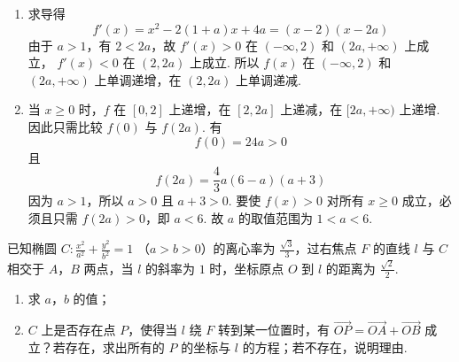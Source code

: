 \begin{solution}
\begin{enumerate}
\item 求导得
\[
f'(x)=x^2-2(1+a)x+4a=(x-2)(x-2a)
\]
由于 \(a>1\)，有 \(2<2a\)，故
\(f'(x)>0\) 在 \((-\infty,2)\) 和 \((2a,+\infty)\) 上成立，
\(f'(x)<0\) 在 \((2,2a)\) 上成立. 所以 \(f(x)\) 在
\((-\infty,2)\) 和 \((2a,+\infty)\) 上单调递增，在
\((2,2a)\) 上单调递减.
\item 当 \(x\geqslant0\) 时，\(f\) 在 \([0,2]\) 上递增，在
\([2,2a]\) 上递减，在 \([2a,+\infty)\) 上递增. 因此只需比较
\(f(0)\) 与 \(f(2a)\). 有
\[
f(0)=24a>0
\]
且
\[
f(2a)=\frac43a(6-a)(a+3)
\]
因为 \(a>1\)，所以 \(a>0\) 且 \(a+3>0\). 要使
\(f(x)>0\) 对所有 \(x\geqslant0\) 成立，必须且只需
\(f(2a)>0\)，即 \(a<6\). 故 \(a\) 的取值范围为
\(1<a<6\).
\end{enumerate}
\end{solution}

\begin{problem}
已知椭圆 \(C: \frac{x^2}{a^2} + \frac{y^2}{b^2} = 1 \) （\(a > b > 0\)）的离心率为 \(\frac{\sqrt{3}}{3}\)，过右焦点 \(F\) 的直线 \(l\) 与 \(C\) 相交于 \(A\)，\(B\) 两点，当 \(l\) 的斜率为 \(1\) 时，坐标原点 \(O\) 到 \(l\) 的距离为 \(\frac{\sqrt{2}}{2}\).

\begin{enumerate}
\item 求 \(a\)，\(b\) 的值；
\item \(C\) 上是否存在点 \(P\)，使得当 \(l\) 绕 \(F\) 转到某一位置时，有 \(\overrightarrow{OP} = \overrightarrow{OA} + \overrightarrow{OB}\) 成立？若存在，求出所有的 \(P\) 的坐标与 \(l\) 的方程；若不存在，说明理由.
\end{enumerate}
\end{problem}

